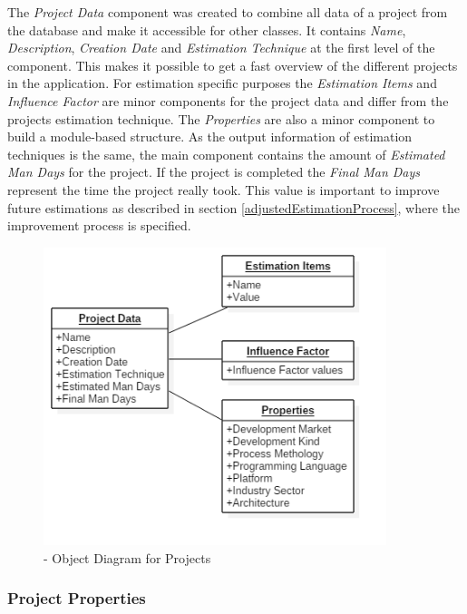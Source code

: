 The \textit{Project Data} component was created to combine all data of a project from the database and make it accessible for other classes. It contains \textit{Name}, \textit{Description}, \textit{Creation Date} and \textit{Estimation Technique} at the first level of the component. This makes it possible to get a fast overview of the different projects in the application. For estimation specific purposes the \textit{Estimation Items} and \textit{Influence Factor} are minor components for the project data and differ from the projects estimation technique. The \textit{Properties} are also a minor component to build a module-based structure. As the output information of estimation techniques is the same, the main component contains the amount of \textit{Estimated Man Days} for the project. If the project is completed the \textit{Final Man Days} represent the time the project really took. This value is important to improve future estimations as described in section \ref{adjustedEstimationProcess}, where the improvement process is specified.
\begin{figure}[h] 
	\centering 
	\includegraphics[width=10cm]{images/ObjectDiagramProject.png} 
	\caption{- Object Diagram for Projects} 
	\label{fig:objectDiagrammProject}
\end{figure}

\subsubsection{Project Properties}

